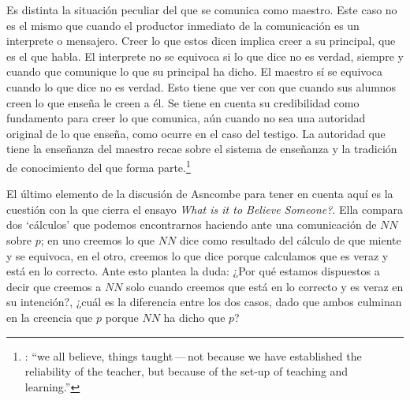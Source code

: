 Es distinta la situación peculiar del que se comunica como maestro. Este caso no es el mismo que cuando el productor inmediato de la comunicación es un interprete o mensajero. Creer lo que estos dicen implica creer a su principal, que es el que habla. El interprete no se equivoca si lo que dice no es verdad, siempre y cuando que comunique lo que su principal ha dicho. El maestro sí se equivoca cuando lo que dice no es verdad. Esto tiene que ver con que cuando sus alumnos creen lo que enseña le creen a él. Se tiene en cuenta su credibilidad como fundamento para creer lo que comunica, aún cuando no sea una autoridad original de lo que enseña, como ocurre en el caso del testigo. La autoridad que tiene la enseñanza del maestro recae sobre el sistema de enseñanza y la tradición de conocimiento del que forma parte.\footnote{\cite[Cf.~][214]{teichmann2008ans}: \enquote{we all believe, things taught\,---\,not because we have established the reliability of the teacher, but because of the set-up of teaching and learning.}}

El último elemento de la discusión de Asncombe para tener en cuenta aquí es la cuestión con la que cierra el ensayo \emph{What is it to Believe Someone?}. Ella compara dos `cálculos' que podemos encontrarnos haciendo ante una comunicación de $NN$ sobre $p$; en uno creemos lo que $NN$ dice como resultado del cálculo de que miente y se equivoca, en el otro, creemos lo que dice porque calculamos que es veraz y está en lo correcto. Ante esto plantea la duda: ¿Por qué estamos dispuestos a decir que creemos a $NN$ solo cuando creemos que está en lo correcto y es veraz en su intención?, ¿cuál es la diferencia entre los dos casos, dado que ambos culminan en la creencia que $p$ porque $NN$ ha dicho que $p$?

